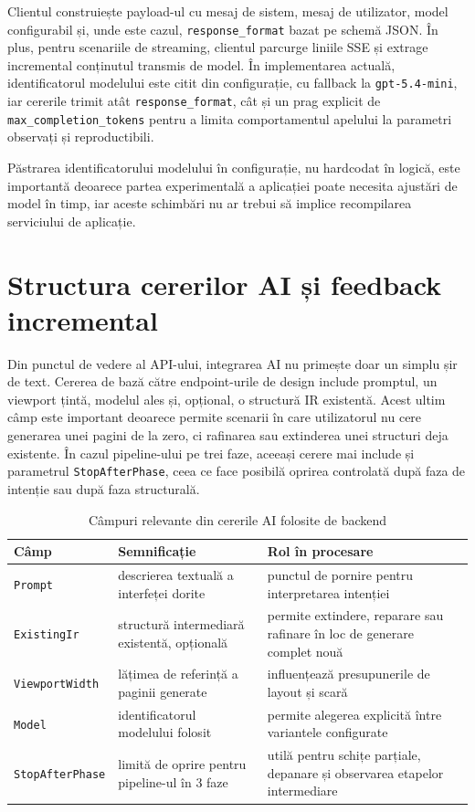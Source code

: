 Clientul construiește payload-ul cu mesaj de sistem, mesaj de utilizator, model configurabil și, unde este cazul, \texttt{response\_format} bazat pe schemă JSON. În plus, pentru scenariile de streaming, clientul parcurge liniile SSE și extrage incremental conținutul transmis de model. În implementarea actuală, identificatorul modelului este citit din configurație, cu fallback la \texttt{gpt-5.4-mini}, iar cererile trimit atât \texttt{response\_format}, cât și un prag explicit de \texttt{max\_completion\_tokens} pentru a limita comportamentul apelului la parametri observați și reproductibili.

Păstrarea identificatorului modelului în configurație, nu hardcodat în logică, este importantă deoarece partea experimentală a aplicației poate necesita ajustări de model în timp, iar aceste schimbări nu ar trebui să implice recompilarea serviciului de aplicație.

\section{Structura cererilor AI și feedback incremental}

Din punctul de vedere al API-ului, integrarea AI nu primește doar un simplu șir de text. Cererea de bază către endpoint-urile de design include promptul, un viewport țintă, modelul ales și, opțional, o structură IR existentă. Acest ultim câmp este important deoarece permite scenarii în care utilizatorul nu cere generarea unei pagini de la zero, ci rafinarea sau extinderea unei structuri deja existente. În cazul pipeline-ului pe trei faze, aceeași cerere mai include și parametrul \texttt{StopAfterPhase}, ceea ce face posibilă oprirea controlată după faza de intenție sau după faza structurală.

\begin{table}[H]
  \centering
  \caption{Câmpuri relevante din cererile AI folosite de backend}
  \label{tab:campuri-cereri-ai}
  \renewcommand{\arraystretch}{1.15}
  \begin{tabularx}{\textwidth}{>{\RaggedRight\arraybackslash}p{3.2cm}YY}
    \toprule
    \textbf{Câmp} & \textbf{Semnificație} & \textbf{Rol în procesare} \\
    \midrule
    \texttt{Prompt} & descrierea textuală a interfeței dorite & punctul de pornire pentru interpretarea intenției \\
    \texttt{ExistingIr} & structură intermediară existentă, opțională & permite extindere, reparare sau rafinare în loc de generare complet nouă \\
    \texttt{ViewportWidth} & lățimea de referință a paginii generate & influențează presupunerile de layout și scară \\
    \texttt{Model} & identificatorul modelului folosit & permite alegerea explicită între variantele configurate \\
    \texttt{StopAfterPhase} & limită de oprire pentru pipeline-ul în 3 faze & utilă pentru schițe parțiale, depanare și observarea etapelor intermediare \\
    \bottomrule
  \end{tabularx}
\end{table}

